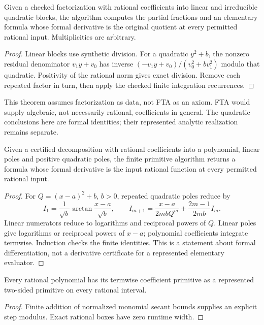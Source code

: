 \begin{theorem}
\label{thm:factored-rational-primitive-formula}
\leanok
Given a checked factorization with rational coefficients into linear and
irreducible quadratic blocks, the algorithm computes the partial fractions
and an elementary formula whose formal derivative is the original quotient
at every permitted rational input. Multiplicities are arbitrary.
\end{theorem}
\begin{proof}\leanok
Linear blocks use synthetic division. For a quadratic \(y^2+b\), the
nonzero residual denominator \(v_1y+v_0\) has inverse
\((-v_1y+v_0)/(v_0^2+bv_1^2)\) modulo that quadratic. Positivity of the
rational norm gives exact division. Remove each repeated factor in turn,
then apply the checked finite integration recurrences.
\end{proof}
This theorem assumes factorization as data, not FTA as an axiom. FTA would
supply algebraic, not necessarily rational, coefficients in general. The
quadratic conclusions here are formal identities; their represented analytic
realization remains separate.

\begin{theorem}
\label{thm:rational-primitive-formula}
\leanok
Given a certified decomposition with rational coefficients into a polynomial,
linear poles and positive quadratic poles, the finite primitive algorithm
returns a formula whose formal derivative is the input rational function at
every permitted rational input.
\end{theorem}
\begin{proof}\leanok
For \(Q=(x-a)^2+b\), \(b>0\), repeated quadratic poles reduce by
\[
 I_1=\frac1{\sqrt b}\arctan\frac{x-a}{\sqrt b},\qquad
 I_{m+1}=\frac{x-a}{2mbQ^m}+\frac{2m-1}{2mb}I_m.
\]
Linear numerators reduce to logarithms and reciprocal powers of \(Q\).
Linear poles give logarithms or reciprocal powers of \(x-a\); polynomial
coefficients integrate termwise. Induction checks the finite identities.
This is a statement about formal differentiation, not a derivative
certificate for a represented elementary evaluator.
\end{proof}

\begin{theorem}
\label{thm:rational-polynomial-primitive-analytic}
\leanok
Every rational polynomial has its termwise coefficient primitive as a
represented two-sided primitive on every rational interval.
\end{theorem}
\begin{proof}\leanok
Finite addition of normalized monomial secant bounds supplies an explicit
step modulus. Exact rational boxes have zero runtime width.
\end{proof}

